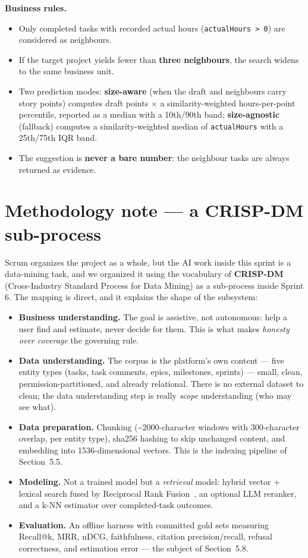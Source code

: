 \textbf{Business rules.}
\begin{itemize}
  \item Only completed tasks with recorded actual hours (\texttt{actualHours > 0}) are considered
    as neighbours.
  \item If the target project yields fewer than \textbf{three neighbours}, the search widens to
    the same business unit.
  \item Two prediction modes: \textbf{size-aware} (when the draft and neighbours carry story
    points) computes draft points $\times$ a similarity-weighted hours-per-point percentile,
    reported as a median with a 10th/90th band; \textbf{size-agnostic} (fallback) computes a
    similarity-weighted median of \texttt{actualHours} with a 25th/75th IQR band.
  \item The suggestion is \textbf{never a bare number}: the neighbour tasks are always returned
    as evidence.
\end{itemize}

\section{Methodology note --- a CRISP-DM sub-process}

Scrum organizes the project as a whole, but the AI work inside this sprint is a data-mining task, and we
organized it using the vocabulary of \textbf{CRISP-DM}~\cite{shearer2000crisp} (Cross-Industry Standard Process for Data Mining) as a
sub-process inside Sprint 6. The mapping is direct, and it explains the shape of the subsystem:

\begin{itemize}
  \item \textbf{Business understanding.} The goal is assistive, not autonomous: help a user find and estimate, never
  decide for them. This is what makes \emph{honesty over coverage} the governing rule.
  \item \textbf{Data understanding.} The corpus is the platform's own content --- five entity types (tasks, task comments,
  epics, milestones, sprints) --- small, clean, permission-partitioned, and already relational. There is no
  external dataset to clean; the data understanding step is really \emph{scope} understanding (who may see what).
  \item \textbf{Data preparation.} Chunking (\textasciitilde2000-character windows with 300-character overlap, per entity type), sha256
  hashing to skip unchanged content, and embedding into 1536-dimensional vectors. This is the indexing
  pipeline of Section~5.5.
  \item \textbf{Modeling.} Not a trained model but a \emph{retrieval} model: hybrid vector + lexical search fused by Reciprocal
  Rank Fusion~\cite{cormack2009rrf}, an optional LLM reranker, and a k-NN estimator over completed-task outcomes.
  \item \textbf{Evaluation.} An offline harness with committed gold sets measuring Recall@k, MRR, nDCG, faithfulness,
  citation precision/recall, refusal correctness, and estimation error --- the subject of Section~5.8.
\end{itemize}

